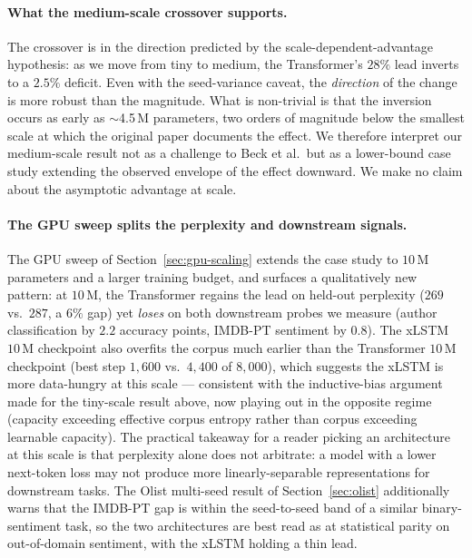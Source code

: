 \documentclass[11pt]{article}
\begin{document}
\paragraph{What the medium-scale crossover supports.}
The crossover is in the direction predicted by the
scale-dependent-advantage hypothesis: as we move from tiny to medium,
the Transformer's $28\%$ lead inverts to a $2.5\%$ deficit. Even with
the seed-variance caveat, the \emph{direction} of the change is more
robust than the magnitude. What is non-trivial is that the inversion
occurs as early as $\sim$4.5\,M parameters, two orders of magnitude
below the smallest scale at which the original paper documents the
effect. We therefore interpret our medium-scale result not as a
challenge to Beck et al.\ but as a lower-bound case study extending the
observed envelope of the effect downward. We make no claim about the
asymptotic advantage at scale.

\paragraph{The GPU sweep splits the perplexity and downstream signals.}
The GPU sweep of Section~\ref{sec:gpu-scaling} extends the case study
to $10$\,M parameters and a larger training budget, and surfaces a
qualitatively new pattern: at $10$\,M, the Transformer regains the lead
on held-out perplexity ($269$ vs.\ $287$, a $6\%$ gap) yet \emph{loses}
on both downstream probes we measure (author classification by
$2.2$ accuracy points, IMDB-PT sentiment by $0.8$). The xLSTM $10$\,M
checkpoint also overfits the corpus much earlier than the Transformer
$10$\,M checkpoint (best step $1{,}600$ vs.\ $4{,}400$ of $8{,}000$),
which suggests the xLSTM is more data-hungry at this scale --- consistent
with the inductive-bias argument made for the tiny-scale result above,
now playing out in the opposite regime (capacity exceeding effective
corpus entropy rather than corpus exceeding learnable capacity). The
practical takeaway for a reader picking an architecture at this scale
is that perplexity alone does not arbitrate: a model with a lower next-token
loss may not produce more linearly-separable representations for
downstream tasks. The Olist multi-seed result of
Section~\ref{sec:olist} additionally warns that the IMDB-PT gap is
within the seed-to-seed band of a similar binary-sentiment task, so the
two architectures are best read as at statistical parity on out-of-domain
sentiment, with the xLSTM holding a thin lead.
\end{document}
